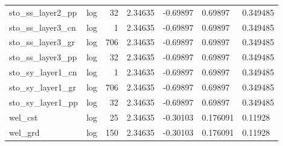 \documentclass{article}
\begin{document}
\begin{center}
\begin{landscape}
\begin{longtable}{llrllll}
   sto\_ss\_layer2\_pp &       log &     32 &        2.34635 &            -0.69897 &            0.69897 &           0.349485 \\
   sto\_ss\_layer3\_cn &       log &      1 &        2.34635 &            -0.69897 &            0.69897 &           0.349485 \\
   sto\_ss\_layer3\_gr &       log &    706 &        2.34635 &            -0.69897 &            0.69897 &           0.349485 \\
   sto\_ss\_layer3\_pp &       log &     32 &        2.34635 &            -0.69897 &            0.69897 &           0.349485 \\
   sto\_sy\_layer1\_cn &       log &      1 &        2.34635 &            -0.69897 &            0.69897 &           0.349485 \\
   sto\_sy\_layer1\_gr &       log &    706 &        2.34635 &            -0.69897 &            0.69897 &           0.349485 \\
   sto\_sy\_layer1\_pp &       log &     32 &        2.34635 &            -0.69897 &            0.69897 &           0.349485 \\
            wel\_cst &       log &     25 &        2.34635 &            -0.30103 &           0.176091 &            0.11928 \\
            wel\_grd &       log &    150 &        2.34635 &            -0.30103 &           0.176091 &            0.11928 \\
\end{longtable}
\end{landscape}
\end{center}
\end{document}
